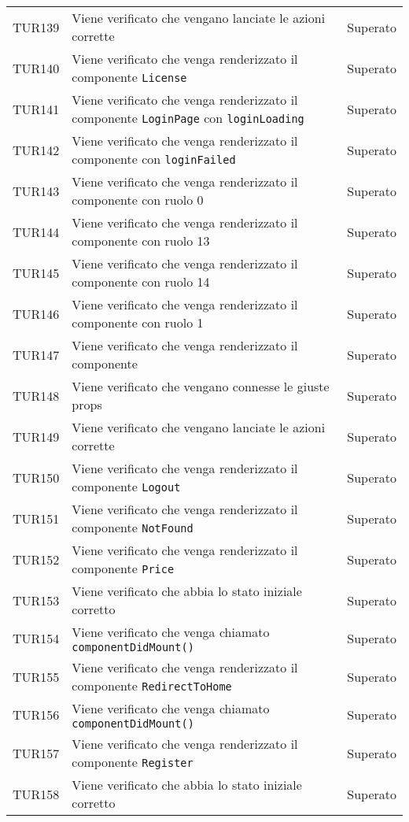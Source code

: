 \documentclass[PianoDiQualifica.tex]{subfiles}
\begin{document}
\begin{longtable}[H]{P{2cm}P{8.5cm}P{3cm}}
	TUR139 & Viene verificato che vengano lanciate le azioni corrette & Superato \\ 
	TUR140 & Viene verificato che venga renderizzato il componente \texttt{License} & Superato \\ 
	TUR141 & Viene verificato che venga renderizzato il componente \texttt{LoginPage} con \texttt{loginLoading} & Superato \\ 
	TUR142 & Viene verificato che venga renderizzato il componente con \texttt{loginFailed} & Superato \\ 
	TUR143 & Viene verificato che venga renderizzato il componente con ruolo 0 & Superato \\ 
	TUR144 & Viene verificato che venga renderizzato il componente con ruolo 13 & Superato \\ 
	TUR145 & Viene verificato che venga renderizzato il componente con ruolo 14 & Superato \\ 
	TUR146 & Viene verificato che venga renderizzato il componente con ruolo 1 & Superato \\ 
	TUR147 & Viene verificato che venga renderizzato il componente & Superato \\ 
	TUR148 & Viene verificato che vengano connesse le giuste props & Superato \\ 
	TUR149 & Viene verificato che vengano lanciate le azioni corrette & Superato \\ 
	TUR150 & Viene verificato che venga renderizzato il componente \texttt{Logout} & Superato \\ 
	TUR151 & Viene verificato che venga renderizzato il componente \texttt{NotFound} & Superato \\ 
	TUR152 & Viene verificato che venga renderizzato il componente \texttt{Price} & Superato \\ 
	TUR153 & Viene verificato che abbia lo stato iniziale corretto & Superato \\ 
	TUR154 & Viene verificato che venga chiamato \texttt{componentDidMount()} & Superato \\ 
	TUR155 & Viene verificato che venga renderizzato il componente \texttt{RedirectToHome} & Superato \\ 
	TUR156 & Viene verificato che venga chiamato \texttt{componentDidMount()} & Superato \\ 
	TUR157 & Viene verificato che venga renderizzato il componente \texttt{Register} & Superato \\ 
	TUR158 & Viene verificato che abbia lo stato iniziale corretto & Superato \\ 

\end{longtable}
\end{document}
